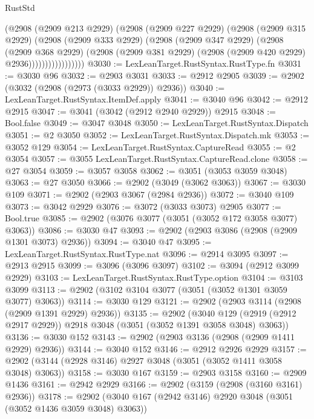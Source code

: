 \begin{lexlean}{RustStd}
\begin{coremodule}
                      (@2908
                        (@2909 @213 @2929)
                        (@2908
                          (@2909 @227 @2929)
                          (@2908
                            (@2909 @315 @2929)
                            (@2908
                              (@2909 @333 @2929)
                              (@2908
                                (@2909 @347 @2929)
                                (@2908
                                  (@2909 @368 @2929)
                                  (@2908
                                    (@2909 @381 @2929)
                                    (@2908 (@2909 @420 @2929) @2936)))))))))))))))))
@3030 := LexLeanTarget.RustSyntax.RustType.fn
@3031 := @3030 @96
@3032 := @2903 @3031
@3033 := @2912 @2905
@3039 := @2902 (@3032 (@2908 (@2973 (@3033 @2929)) @2936))
@3040 := LexLeanTarget.RustSyntax.ItemDef.apply
@3041 := @3040 @96
@3042 := @2912 @2915
@3047 := @3041 (@3042 (@2912 @2940 @2929)) @2915
@3048 := Bool.false
@3049 := @3047 @3048
@3050 := LexLeanTarget.RustSyntax.Dispatch
@3051 := @2 @3050
@3052 := LexLeanTarget.RustSyntax.Dispatch.mk
@3053 := @3052 @129
@3054 := LexLeanTarget.RustSyntax.CaptureRead
@3055 := @2 @3054
@3057 := @3055 LexLeanTarget.RustSyntax.CaptureRead.clone
@3058 := @27 @3054
@3059 := @3057 @3058
@3062 := @3051 (@3053 @3059 @3048)
@3063 := @27 @3050
@3066 := @2902 (@3049 (@3062 @3063))
@3067 := @3030 @109
@3071 := @2902 (@2903 @3067 (@2984 @2936))
@3072 := @3040 @109
@3073 := @3042 @2929
@3076 := @3072 (@3033 @3073) @2905
@3077 := Bool.true
@3085 := @2902 (@3076 @3077 (@3051 (@3052 @172 @3058 @3077) @3063))
@3086 := @3030 @47
@3093 := @2902 (@2903 @3086 (@2908 (@2909 @1301 @3073) @2936))
@3094 := @3040 @47
@3095 := LexLeanTarget.RustSyntax.RustType.nat
@3096 := @2914 @3095
@3097 := @2913 @2915
@3099 := @3096 (@3096 @3097)
@3102 := @3094 (@2912 @3099 @2929)
@3103 := LexLeanTarget.RustSyntax.RustType.option
@3104 := @3103 @3099
@3113 := @2902 (@3102 @3104 @3077 (@3051 (@3052 @1301 @3059 @3077) @3063))
@3114 := @3030 @129
@3121 := @2902 (@2903 @3114 (@2908 (@2909 @1391 @2929) @2936))
@3135 := @2902
    (@3040 @129 (@2919 (@2912 @2917 @2929)) @2918 @3048 (@3051 (@3052 @1391 @3058 @3048) @3063))
@3136 := @3030 @152
@3143 := @2902 (@2903 @3136 (@2908 (@2909 @1411 @2929) @2936))
@3144 := @3040 @152
@3146 := @2912 @2926 @2929
@3157 := @2902 (@3144 (@2928 @3146) @2927 @3048 (@3051 (@3052 @1411 @3058 @3048) @3063))
@3158 := @3030 @167
@3159 := @2903 @3158
@3160 := @2909 @1436
@3161 := @2942 @2929
@3166 := @2902 (@3159 (@2908 (@3160 @3161) @2936))
@3178 := @2902 (@3040 @167 (@2942 @3146) @2920 @3048 (@3051 (@3052 @1436 @3059 @3048) @3063))

\end{coremodule}
\end{lexlean}
